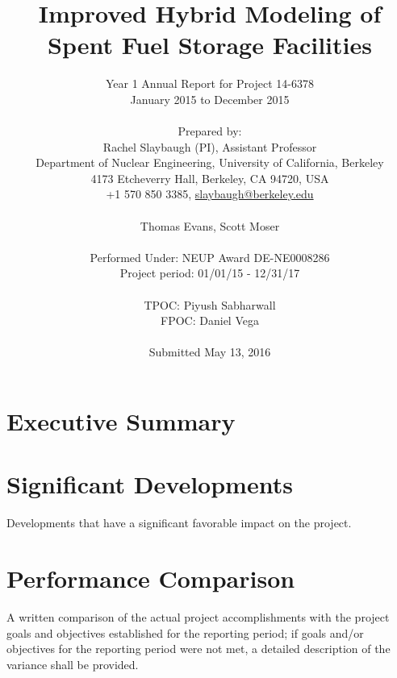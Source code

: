 \documentclass[12pt]{article}
\title{Improved Hybrid Modeling of Spent Fuel Storage Facilities}
\author{ 
  Year 1 Annual Report for Project 14-6378\\
  January 2015 to December 2015\\
  \\
  Prepared by:\\
  Rachel Slaybaugh (PI), Assistant Professor \\
  Department of Nuclear Engineering, University of California, Berkeley \\
  4173 Etcheverry Hall, Berkeley, CA 94720, USA\\
  +1 570 850 3385, 
  \href{mailto:slaybaugh@berkeley.edu}{slaybaugh@berkeley.edu}\\
  \\
  Thomas Evans, Scott Moser\\
  \\
  Performed Under: NEUP Award DE-NE0008286\\
  Project period: 01/01/15 - 12/31/17 \\
  \\
  TPOC: Piyush Sabharwall\\
  FPOC: Daniel Vega\\
  \\
  Submitted May 13, 2016
}
\begin{document}


\maketitle
\clearpage
\tableofcontents
\clearpage
%

%
\section*{Executive Summary}
\label{sect::summary}

\clearpage
\section{Significant Developments}
\label{sect::sig-devel}
Developments that have a significant favorable impact on the project.

\section{Performance Comparison}
\label{sect::perf-comp} 
A written comparison of the actual project accomplishments with the project goals and objectives established for the reporting period; if goals and/or objectives for the reporting period were not met, a detailed description of the variance shall be provided. 
\end{document}
